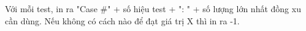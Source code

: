 Với mỗi test, in ra "Case \#" + số hiệu test + ": " + số lượng lớn nhất đồng xu cần dùng. Nếu không có cách nào để đạt giá trị X thì in ra -1.